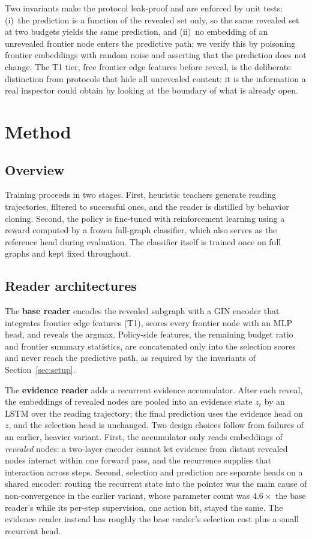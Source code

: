\documentclass{article}
\begin{document}
Two invariants make the protocol leak-proof and are enforced by unit tests: (i)~the prediction is a function of the revealed set only, so the same revealed set at two budgets yields the same prediction, and (ii)~no embedding of an unrevealed frontier node enters the predictive path; we verify this by poisoning frontier embeddings with random noise and asserting that the prediction does not change. The T1 tier, free frontier edge features before reveal, is the deliberate distinction from protocols that hide all unrevealed content: it is the information a real inspector could obtain by looking at the boundary of what is already open.

\section{Method}
\label{sec:method}

\subsection{Overview}
Training proceeds in two stages. First, heuristic teachers generate reading trajectories, filtered to successful ones, and the reader is distilled by behavior cloning. Second, the policy is fine-tuned with reinforcement learning using a reward computed by a frozen full-graph classifier, which also serves as the reference head during evaluation. The classifier itself is trained once on full graphs and kept fixed throughout.

\subsection{Reader architectures}
The \textbf{base reader} encodes the revealed subgraph with a GIN encoder that integrates frontier edge features (T1), scores every frontier node with an MLP head, and reveals the argmax. Policy-side features, the remaining budget ratio and frontier summary statistics, are concatenated only into the selection scores and never reach the predictive path, as required by the invariants of Section~\ref{sec:setup}.

The \textbf{evidence reader} adds a recurrent evidence accumulator. After each reveal, the embeddings of revealed nodes are pooled into an evidence state $z_t$ by an LSTM over the reading trajectory; the final prediction uses the evidence head on $z$, and the selection head is unchanged. Two design choices follow from failures of an earlier, heavier variant. First, the accumulator only reads embeddings of \emph{revealed} nodes: a two-layer encoder cannot let evidence from distant revealed nodes interact within one forward pass, and the recurrence supplies that interaction across steps. Second, selection and prediction are separate heads on a shared encoder: routing the recurrent state into the pointer was the main cause of non-convergence in the earlier variant, whose parameter count was $4.6\times$ the base reader's while its per-step supervision, one action bit, stayed the same. The evidence reader instead has roughly the base reader's selection cost plus a small recurrent head.
\end{document}
